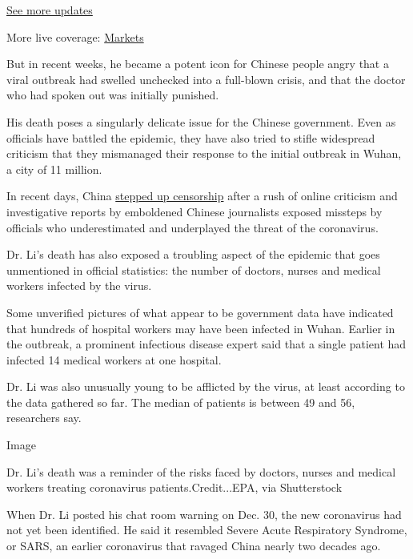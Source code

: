 \href{https://www.nytimes3xbfgragh.onion/2020/09/08/world/covid-19-coronavirus.html?action=click\&pgtype=Article\&state=default\&region=MAIN_CONTENT_1\&context=storylines_live_updates}{See
more updates}

More live coverage:
\href{https://www.nytimes3xbfgragh.onion/live/2020/09/08/business/stock-market-today-coronavirus?action=click\&pgtype=Article\&state=default\&region=MAIN_CONTENT_1\&context=storylines_live_updates}{Markets}

But in recent weeks, he became a potent icon for Chinese people angry
that a viral outbreak had swelled unchecked into a full-blown crisis,
and that the doctor who had spoken out was initially punished.

His death poses a singularly delicate issue for the Chinese government.
Even as officials have battled the epidemic, they have also tried to
stifle widespread criticism that they mismanaged their response to the
initial outbreak in Wuhan, a city of 11 million.

In recent days, China
\href{https://www.nytimes3xbfgragh.onion/2020/02/05/world/asia/china-coronavirus-censorship.html}{stepped
up censorship} after a rush of online criticism and investigative
reports by emboldened Chinese journalists exposed missteps by officials
who underestimated and underplayed the threat of the coronavirus.

Dr. Li's death has also exposed a troubling aspect of the epidemic that
goes unmentioned in official statistics: the number of doctors, nurses
and medical workers infected by the virus.

Some unverified pictures of what appear to be government data have
indicated that hundreds of hospital workers may have been infected in
Wuhan. Earlier in the outbreak, a prominent infectious disease expert
said that a single patient had infected 14 medical workers at one
hospital.

Dr. Li was also unusually young to be afflicted by the virus, at least
according to the data gathered so far. The median of patients is between
49 and 56, researchers say.

Image

Dr. Li's death was a reminder of the risks faced by doctors, nurses and
medical workers treating coronavirus patients.Credit...EPA, via
Shutterstock

When Dr. Li posted his chat room warning on Dec. 30, the new coronavirus
had not yet been identified. He said it resembled Severe Acute
Respiratory Syndrome, or SARS, an earlier coronavirus that ravaged China
nearly two decades ago.

